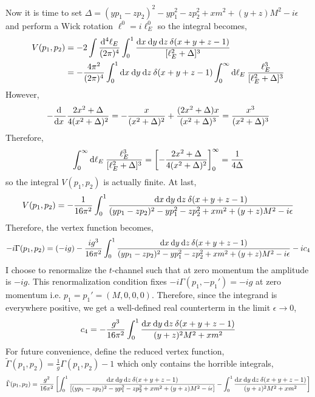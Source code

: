 \documentclass{article}
\begin{document}
Now it is time to set $\Delta = (y p_1 - z p_2)^2 - y p_1^2 - z p_2^2 + x m^2 + (y + z) M^2 - i \epsilon$ and perform a Wick rotation $\ell^0 = i \ell_E^0$ so the integral becomes,
\begin{align*}
V(p_1, p_2) & = -2 \int \frac{\mathrm{d}^4 \ell_E}{(2 \pi)^4} \int_0^1 \frac{\mathrm{d}x \: \mathrm{d}y \: \mathrm{d}z \: \delta(x + y + z - 1)}{[\ell_E^2 + \Delta]^3}
\\
& = - \frac{4 \pi^2}{(2 \pi)^4} \int_0^1 \mathrm{d}x \: \mathrm{d}y \: \mathrm{d}z \: \delta(x + y + z - 1) \int_{0}^\infty \mathrm{d}\ell_E \: \frac{\ell_E^3}{[\ell_E^2 + \Delta]^3}
\end{align*}
However, 
\[ - \frac{\mathrm{d} \:}{\mathrm{d}x \:} \frac{2 x^2 + \Delta}{4(x^2 + \Delta)^2} = -\frac{x}{(x^2 + \Delta)^2} + \frac{(2 x^2 + \Delta)x}{(x^2 + \Delta)^3} = \frac{x^3}{(x^2 + \Delta)^3}\]
Therefore, 
\[ \int_{0}^\infty \mathrm{d}\ell_E \: \frac{\ell_E^3}{[\ell_E^2 + \Delta]^3} = \left[ -\frac{2 x^2 + \Delta}{4(x^2 + \Delta)^2} \right]_{0}^\infty = \frac{1}{4 \Delta} \]
so the integral $V(p_1, p_2)$ is actually finite. At last,
\[ V(p_1, p_2) = -\frac{1}{16 \pi^2} \int_0^1 \frac{\mathrm{d}x \: \mathrm{d}y \: \mathrm{d}z \: \delta(x + y + z - 1) }{(y p_1 - z p_2)^2 - y p_1^2 - z p_2^2 + x m^2 + (y + z) M^2 - i \epsilon} \]
Therefore, the vertex function becomes,
\[ - i \Gamma(p_1, p_2) = (-ig) - \frac{ig^3}{16 \pi^2} \int_0^1 \frac{\mathrm{d}x \: \mathrm{d}y \: \mathrm{d}z \: \delta(x + y + z - 1) }{(y p_1 - z p_2)^2 - y p_1^2 - z p_2^2 + x m^2 + (y + z) M^2 - i \epsilon} - i c_4\]
I choose to renormalize the $t$-channel such that at zero momentum the amplitude is $-ig$. This renormalization condition fixes $-i \Gamma(p_1, -p_1') = - i g$ at zero momentum i.e. $p_1 = p_1' = (M, 0, 0, 0)$. 
Therefore, since the integrand is everywhere positive, we get a well-defined real counterterm in the limit $\epsilon \to 0$,
\[ c_4 = - \frac{g^3}{16 \pi^2} \int_0^1 \frac{\mathrm{d}x \: \mathrm{d}y \: \mathrm{d}z \: \delta(x + y + z - 1) }{(y + z)^2 M^2  + x m^2} \]
For future convenience, define the reduced vertex function, $\tilde{\Gamma}(p_1, p_2) = \frac{1}{g}\Gamma(p_1, p_2) - 1$ which only contains the horrible integrals,
\[ \tilde{\Gamma}(p_1, p_2) =  \frac{ g^2}{16 \pi^2} \left[ \int_0^1 \frac{\mathrm{d}x \: \mathrm{d}y \: \mathrm{d}z \: \delta(x + y + z - 1)}{[(y p_1 - z p_2)^2 - y p_1^2 - z p_2^2 + x m^2 + (y + z) M^2 - i \epsilon]} - \int_0^1 \frac{\mathrm{d}x \: \mathrm{d}y \: \mathrm{d}z \: \delta(x + y + z - 1) }{(y + z)^2 M^2  + x m^2} \right]\]
\end{document}
